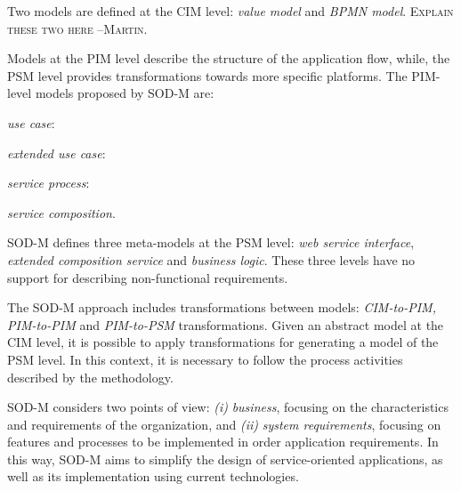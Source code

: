 Two models are defined at the CIM level: \textit{value model}
and \textit{BPMN model}.
\textsc{Explain these two here --Martin.}

Models at the PIM level describe the structure of the application flow,
while, the PSM level provides transformations towards more specific platforms.
The PIM-level models proposed by SOD-M are:
\begin{trivlist}
\item \textit{use case}:
\item \textit{extended use case}:
\item \textit{service process}:
\item \textit{service composition}.
\end{trivlist}

SOD-M defines three meta-models at the PSM level: \textit{web service interface}, \textit{extended composition service} and \textit{business logic}.
These three levels have no support for describing non-functional requirements.

The SOD-M approach includes transformations between models:
\textit{CIM-to-PIM, PIM-to-PIM} and \textit{PIM-to-PSM} transformations. Given
an abstract model at the CIM level, it is possible to apply transformations for
generating a model of the PSM level. In this context, it is necessary to
follow the process activities described by the methodology.

SOD-M considers two points of view:
\textit{(i)} \textit{business}, focusing on the characteristics and requirements
of the organization, and \textit{(ii)} \textit{system requirements}, focusing on
features and processes to be implemented in order application requirements. In
this way, SOD-M aims to simplify the design of service-oriented applications, as
well as its implementation using current technologies. 